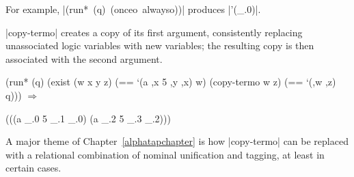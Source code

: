 \noindent For example, \mbox{\scheme|(run* (q) (onceo alwayso))|} produces \scheme|'(_.0)|.


\scheme|copy-termo| creates a copy of its first argument, consistently
replacing unassociated logic variables with new variables; the
resulting copy is then associated with the second argument.

\schemedisplayspace
\begin{schemedisplay}
(run* (q)
  (exist (w x y z)
    (== `(a ,x 5 ,y ,x) w)
    (copy-termo w z)
    (== `(,w ,z) q))) $\Rightarrow$
\end{schemedisplay}
\nspace
\begin{schemeresponse}
(((a _.0 5 _.1 _.0) (a _.2 5 _.3 _.2)))
\end{schemeresponse}

\noindent A major theme of Chapter~\ref{alphatapchapter} is how
\scheme|copy-termo| can be replaced with a relational combination of
nominal unification and tagging, at least in certain cases.
